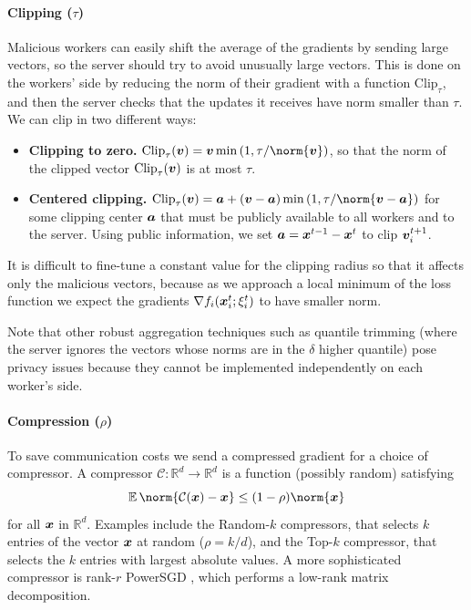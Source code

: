 \documentclass{article}
\begin{document}
\paragraph*{Clipping ($\tau$)} \parencite{LearningFromHistory} Malicious workers can easily shift the average of the gradients by sending large vectors, so the server should try to avoid unusually large vectors. This is done on the workers' side by reducing the norm of their gradient with a function $\mathrm{Clip}_\tau$, and then the server checks that the updates it receives have norm smaller than $\tau$. We can clip in two different ways:

\begin{itemize}
\item \textbf{Clipping to zero.} $\mathrm{Clip}_\tau(\vv) = \vv \min\left(1, \tau / \norm{\vv}\right)$, so that the norm of the clipped vector $\mathrm{Clip}_\tau(\vv)$ is at most $\tau$.

\item \textbf{Centered clipping.} $\mathrm{Clip}_\tau(\vv) = \aa + (\vv-\aa) \min\left(1, \tau / \norm{\vv - \aa}\right)$ for some clipping center $\aa$ that must be publicly available to all workers and to the server. Using public information, we set $\aa = \xx^{t-1} - \xx^{t}$ to clip $\vv_i^{t+1}$.
\end{itemize}

It is difficult to fine-tune a constant value for the clipping radius so that it affects only the malicious vectors, because as we approach a local minimum of the loss function we expect the gradients $\nabla f_i(\xx_i^t;\xi_i^t)$ to have smaller norm.

Note that other robust aggregation techniques such as quantile trimming (where the server ignores the vectors whose norms are in the $\delta$ higher quantile) pose privacy issues because they cannot be implemented independently on each worker's side.


\paragraph*{Compression ($\rho$)} To save communication costs we send a compressed gradient for a choice of compressor. A compressor $\mathcal C : \mathbb R^d \to \mathbb R^d$ is a function (possibly random) satisfying
\[
  \E \norm{\mathcal C(\xx) - \xx} \le (1-\rho) \norm{\xx}
\] 
for all $\xx$ in $\mathbb R^d$. Examples include the Random-$k$ compressors, that selects $k$ entries of the vector $\xx$ at random ($\rho = k/d$), and the Top-$k$ compressor, that selects the $k$ entries with largest absolute values. A more sophisticated compressor is rank-$r$ PowerSGD \parencite{Powersgd}, which performs a low-rank matrix decomposition.
\end{document}
